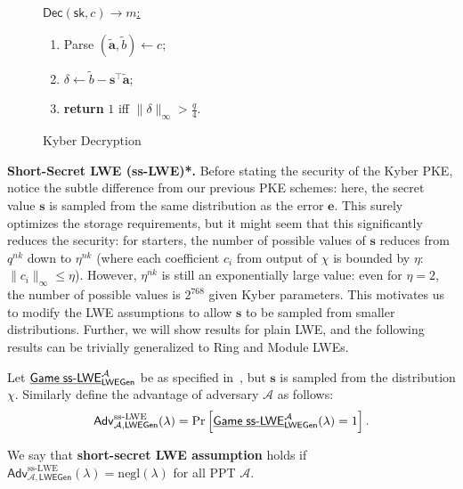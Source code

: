 \documentclass{template}
\begin{document}
\begin{figure}[ht]
\begin{minipage}[t]{0.32\linewidth}
    \caption{Kyber Encryption} 
    \label{fig:kyber-enc}
\end{minipage}
\hfill
\begin{minipage}[t]{0.32\linewidth}
    \begin{mdframed}[linecolor=black, linewidth=1.0pt,
                     skipabove=5pt, skipbelow=5pt,
                     innerleftmargin=5pt, innerrightmargin=5pt]
        \centering
        \colorbox{green!10}{\underline{$\mathsf{Dec}(\mathsf{sk}, c) \to m$:}}
        \begin{enumerate}
            \item Parse $(\widetilde{\mathbf{a}}, \widetilde{b}) \gets c$;
            \item $\delta \gets \widetilde{b} - \mathbf{s}^{\top}\widetilde{\mathbf{a}}$;
            \item \textbf{return} $1$ iff $\|\delta\|_{\infty} > \frac{q}{4}$.
        \end{enumerate}
    \end{mdframed}
    \caption{Kyber Decryption}
    \label{fig:kyber-dec}
\end{minipage}
\end{figure}

\textbf{Short-Secret LWE (ss-LWE)*.} Before stating the security of the Kyber
PKE, notice the subtle difference from our previous PKE schemes: here, the
secret value $\mathbf{s}$ is sampled from the same distribution as the error
$\mathbf{e}$. This surely optimizes the storage requirements, but it might seem
that this significantly reduces the security: for starters, the number of
possible values of $\mathbf{s}$ reduces from $q^{nk}$ down to $\eta^{nk}$ (where
each coefficient $c_i$ from output of $\chi$ is bounded by $\eta$:
$\|c_i\|_{\infty} \leq \eta$). However, $\eta^{nk}$ is still an exponentially
large value: even for $\eta=2$, the number of possible values is $2^{768}$ given
Kyber parameters. This motivates us to modify the LWE assumptions to allow
$\mathbf{s}$ to be sampled from smaller distributions. Further, we will show
results for plain LWE, and the following results can be trivially generalized to
Ring and Module LWEs.

\begin{definition}[ss-LWE]
    Let $\underline{\mathsf{Game} \;
    \text{\textsf{ss}-\textsf{LWE}}}_{\mathsf{LWEGen}}^{\mathcal{A}}$ be as
    specified in~, but $\mathbf{s}$ is sampled from the
    distribution $\chi$. Similarly define the advantage of adversary $\mathcal{A}$
    as follows:
    \begin{equation*}
        \mathsf{Adv}^{\text{ss-LWE}}_{\mathcal{A},\mathsf{LWEGen}}(\lambda) = \text{Pr}\left[\underline{\mathsf{Game} \;
    \text{\textsf{ss}-\textsf{LWE}}}_{\mathsf{LWEGen}}^{\mathcal{A}}(\lambda) = 1\right].
    \end{equation*}

    We say that \textbf{short-secret LWE assumption} holds if
    $\mathsf{Adv}^{\text{ss-LWE}}_{\mathcal{A},\mathsf{LWEGen}}(\lambda)=\text{negl}(\lambda)$
    for all PPT $\mathcal{A}$.
\end{definition}
\end{document}
